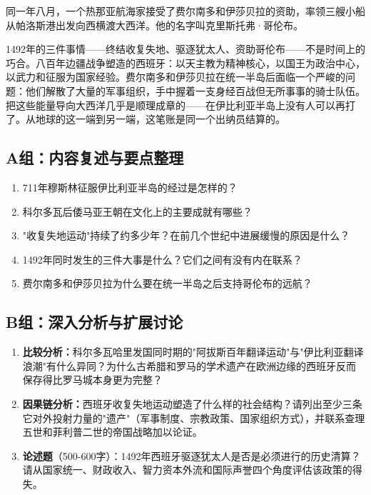 \documentclass[a4paper,12pt]{ctexart}
\begin{document}
同一年八月，一个热那亚航海家接受了费尔南多和伊莎贝拉的资助，率领三艘小船从帕洛斯港出发向西横渡大西洋。他的名字叫克里斯托弗·哥伦布。

1492年的三件事情——终结收复失地、驱逐犹太人、资助哥伦布——不是时间上的巧合。八百年边疆战争塑造的西班牙：以天主教为精神核心，以国王为政治中心，以武力和征服为国家经验。费尔南多和伊莎贝拉在统一半岛后面临一个严峻的问题：他们解散了大量的军事组织，手中握着一支身经百战但无所事事的骑士队伍。把这些能量导向大西洋几乎是顺理成章的——在伊比利亚半岛上没有人可以再打了。从地球的这一端到另一端，这笔账是同一个出纳员结算的。

\subsection*{A组：内容复述与要点整理}

\begin{enumerate}[label=A\arabic*.]
  \item 711年穆斯林征服伊比利亚半岛的经过是怎样的？
  \item 科尔多瓦后倭马亚王朝在文化上的主要成就有哪些？
  \item "收复失地运动"持续了约多少年？在前几个世纪中进展缓慢的原因是什么？
  \item 1492年同时发生的三件大事是什么？它们之间有没有内在联系？
  \item 费尔南多和伊莎贝拉为什么要在统一半岛之后支持哥伦布的远航？
\end{enumerate}

\subsection*{B组：深入分析与扩展讨论}

\begin{enumerate}[label=B\arabic*.]
  \item \textbf{比较分析：}科尔多瓦哈里发国同时期的"阿拔斯百年翻译运动"与"伊比利亚翻译浪潮"有什么异同？为什么古希腊和罗马的学术遗产在欧洲边缘的西班牙反而保存得比罗马城本身更为完整？
  \item \textbf{因果链分析：}西班牙收复失地运动塑造了什么样的社会结构？请列出至少三条它对外投射力量的"遗产"（军事制度、宗教政策、国家组织方式），并联系查理五世和菲利普二世的帝国战略加以论证。
  \item \textbf{论述题}（500-600字）：1492年西班牙驱逐犹太人是否是必须进行的历史清算？请从国家统一、财政收入、智力资本外流和国际声誉四个角度评估该政策的得失。
\end{enumerate}
\end{document}
